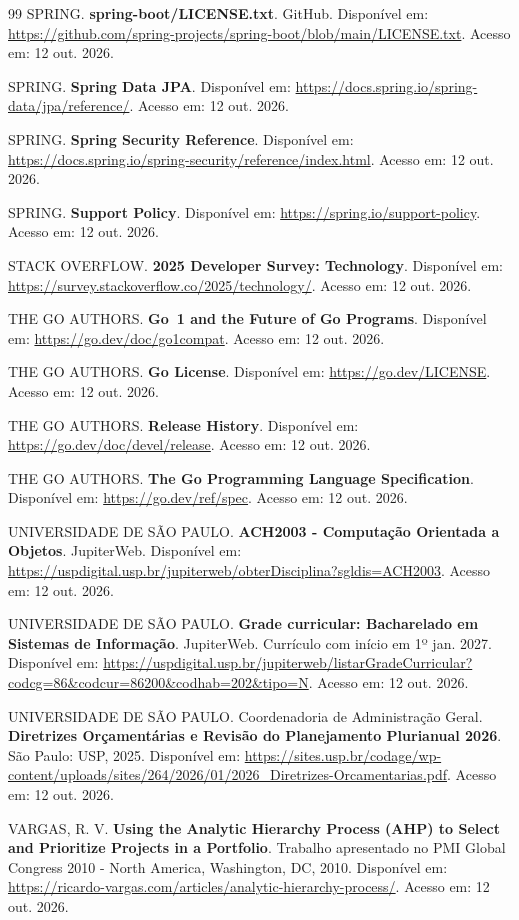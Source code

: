 \documentclass[a4paper]{article}
\begin{document}
\begin{thebibliography}{99}
SPRING. \textbf{spring-boot/LICENSE.txt}. GitHub. Disponível em: \url{https://github.com/spring-projects/spring-boot/blob/main/LICENSE.txt}. Acesso em: 12 out. 2026.

SPRING. \textbf{Spring Data JPA}. Disponível em: \url{https://docs.spring.io/spring-data/jpa/reference/}. Acesso em: 12 out. 2026.

SPRING. \textbf{Spring Security Reference}. Disponível em: \url{https://docs.spring.io/spring-security/reference/index.html}. Acesso em: 12 out. 2026.

SPRING. \textbf{Support Policy}. Disponível em: \url{https://spring.io/support-policy}. Acesso em: 12 out. 2026.

STACK OVERFLOW. \textbf{2025 Developer Survey: Technology}. Disponível em: \url{https://survey.stackoverflow.co/2025/technology/}. Acesso em: 12 out. 2026.

THE GO AUTHORS. \textbf{Go~1 and the Future of Go Programs}. Disponível em: \url{https://go.dev/doc/go1compat}. Acesso em: 12 out. 2026.

THE GO AUTHORS. \textbf{Go License}. Disponível em: \url{https://go.dev/LICENSE}. Acesso em: 12 out. 2026.

THE GO AUTHORS. \textbf{Release History}. Disponível em: \url{https://go.dev/doc/devel/release}. Acesso em: 12 out. 2026.

THE GO AUTHORS. \textbf{The Go Programming Language Specification}. Disponível em: \url{https://go.dev/ref/spec}. Acesso em: 12 out. 2026.

UNIVERSIDADE DE SÃO PAULO. \textbf{ACH2003 - Computação Orientada a Objetos}. JupiterWeb. Disponível em: \url{https://uspdigital.usp.br/jupiterweb/obterDisciplina?sgldis=ACH2003}. Acesso em: 12 out. 2026.

UNIVERSIDADE DE SÃO PAULO. \textbf{Grade curricular: Bacharelado em Sistemas de Informação}. JupiterWeb. Currículo com início em 1º jan. 2027. Disponível em: \url{https://uspdigital.usp.br/jupiterweb/listarGradeCurricular?codcg=86&codcur=86200&codhab=202&tipo=N}. Acesso em: 12 out. 2026.

UNIVERSIDADE DE SÃO PAULO. Coordenadoria de Administração Geral. \textbf{Diretrizes Orçamentárias e Revisão do Planejamento Plurianual 2026}. São Paulo: USP, 2025. Disponível em: \url{https://sites.usp.br/codage/wp-content/uploads/sites/264/2026/01/2026_Diretrizes-Orcamentarias.pdf}. Acesso em: 12 out. 2026.

VARGAS, R. V. \textbf{Using the Analytic Hierarchy Process (AHP) to Select and Prioritize Projects in a Portfolio}. Trabalho apresentado no PMI Global Congress 2010 - North America, Washington, DC, 2010. Disponível em: \url{https://ricardo-vargas.com/articles/analytic-hierarchy-process/}. Acesso em: 12 out. 2026.

\end{thebibliography}
\end{document}
